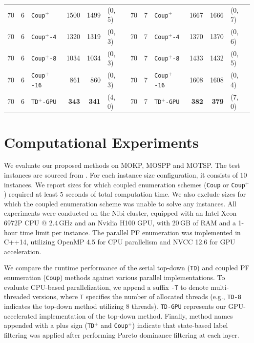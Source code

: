 \documentclass[letterpaper]{article}
\begin{document}
\begin{table}[t]
{\begin{tabular}{rrlrrl|rrlrrl}
70 & 6 & \texttt{Coup}$^+$ & 1500 & 1499 & (0, 5) & 70 & 7 & \texttt{Coup}$^+$ & 1667 & 1666 & (0, 7) \\
70 & 6 & \texttt{Coup}$^+$\texttt{-4} & 1320 & 1319 & (0, 3) & 70 & 7 & \texttt{Coup}$^+$\texttt{-4} & 1370 & 1370 & (0, 6) \\
70 & 6 & \texttt{Coup}$^+$\texttt{-8} & 1034 & 1034 & (0, 3) & 70 & 7 & \texttt{Coup}$^+$\texttt{-8} & 1433 & 1432 & (0, 5) \\
70 & 6 & \texttt{Coup}$^+$\texttt{-16} & 861 & 860 & (0, 3) & 70 & 7 & \texttt{Coup}$^+$\texttt{-16} & 1608 & 1608 & (0, 4) \\
70 & 6 & \texttt{TD}$^+$\texttt{-GPU} & \textbf{343} & \textbf{341} & (4, 0) & 70 & 7 & \texttt{TD}$^+$\texttt{-GPU} & \textbf{382} & \textbf{379} & (7, 0) \\
\bottomrule
\end{tabular}
}
\end{table}


\section{Computational Experiments}
\label{sec:results}

We evaluate our proposed methods on MOKP, MOSPP and MOTSP. The test instances are sourced from \cite{bergman2022network}. For each instance size configuration, it consists of 10 instances. We report sizes for which coupled enumeration schemes (\texttt{Coup} or \texttt{Coup}$^+$) required at least 5 seconds of total computation time. We also exclude sizes for which the coupled enumeration scheme was unable to solve any instances. All experiments were conducted on the Nibi cluster, equipped with an Intel Xeon 6972P CPU @ 2.4\,GHz and an Nvidia H100 GPU, with 20\,GB of RAM and a 1-hour time limit per instance. The parallel PF enumeration was implemented in C++14, utilizing OpenMP 4.5 for CPU parallelism and NVCC 12.6 for GPU acceleration.

We compare the runtime performance of the serial top-down (\texttt{TD}) and coupled PF enumeration (\texttt{Coup}) methods against various parallel implementations. To evaluate CPU-based parallelization, we append a suffix \texttt{-T} to denote multi-threaded versions, where \texttt{T} specifies the number of allocated threads (e.g., \texttt{TD-8} indicates the top-down method utilizing 8 threads). \texttt{TD-GPU} represents our GPU-accelerated implementation of the top-down method. Finally, method names appended with a plus sign (\texttt{TD}$^+$ and \texttt{Coup}$^+$) indicate that state-based label filtering was applied after performing Pareto dominance filtering at each layer.
\end{document}
